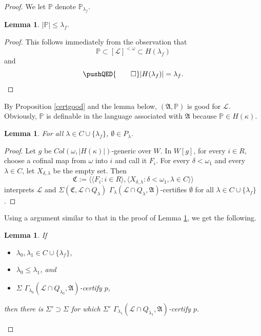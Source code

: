 \documentclass[12pt, twoside]{memoir}
\numberwithin{equation}{section}
\newtheorem{lem}[thm]{Lemma}
\theoremstyle{definition}
\theoremstyle{remark}
\theoremstyle{definition}
\theoremstyle{definition}
\theoremstyle{definition}
\theoremstyle{remark}
\begin{document}
\begin{proof}
We let $\mathbb{P}$ denote $\mathbb{P}_{\lambda_f}$. 

\begin{lem}\label{size}
$|\mathbb{P}| \leq \lambda_f$.
\end{lem}

\begin{proof}
This follows immediately from the observation that $$\mathbb{P} \subset [\mathcal{L}]^{<\omega} \subset H(\lambda_f)$$ and 
\begin{equation*}
    \pushQED{\qed} 
    |H(\lambda_f)| = \lambda_f \text{.} \qedhere
\end{equation*}
\end{proof}

By Proposition \ref{certgood} and the lemma below, $(\mathfrak{A}, \mathbb{P})$ is good for $\mathcal{L}$. Obviously, $\mathbb{P}$ is definable in the language associated with $\mathfrak{A}$ because $\mathbb{P} \in H(\kappa)$.

\begin{lem}\label{nonemp}
For all $\lambda \in C \cup \{\lambda_f\}$, $\emptyset \in P_{\lambda}$.
\end{lem}

\begin{proof}
Let $g$ be $Col(\omega, |H(\kappa)|)$-generic over $W$. In $W[g]$, for every $i \in R$, choose a cofinal map from $\omega$ into $i$ and call it $F_i$. For every $\delta < \omega_1$ and every $\lambda \in C$, let $X_{\delta, \lambda}$ be the empty set. Then $$\mathfrak{C} := \langle \langle F_i : i \in R \rangle, \langle X_{\delta, \lambda} : \delta < \omega_1, \lambda \in C \rangle \rangle$$ interprets $\mathcal{L}$ and $\Sigma(\mathfrak{C}, \mathcal{L} \cap Q_{\lambda})$ $\Gamma_{\lambda} (\mathcal{L} \cap Q_{\lambda}, \mathfrak{A})$-certifies $\emptyset$ for all $\lambda \in C \cup \{\lambda_f\}$.  
\end{proof}

Using a argument similar to that in the proof of Lemma \ref{nonemp}, we get the following.

\begin{lem}\label{extcert}
If 
\begin{itemize}
    \item $\lambda_0, \lambda_1 \in C \cup \{\lambda_f\}$, 
    \item $\lambda_0 \leq \lambda_1$, and 
    \item $\Sigma$ $\Gamma_{\lambda_0} (\mathcal{L} \cap Q_{\lambda_0}, \mathfrak{A})$-certify $p$, 
\end{itemize}
then there is $\Sigma' \supset \Sigma$ for which $\Sigma'$ $\Gamma_{\lambda_1} (\mathcal{L} \cap Q_{\lambda_1}, \mathfrak{A})$-certify $p$.
\end{lem}


\end{proof}
\end{document}
